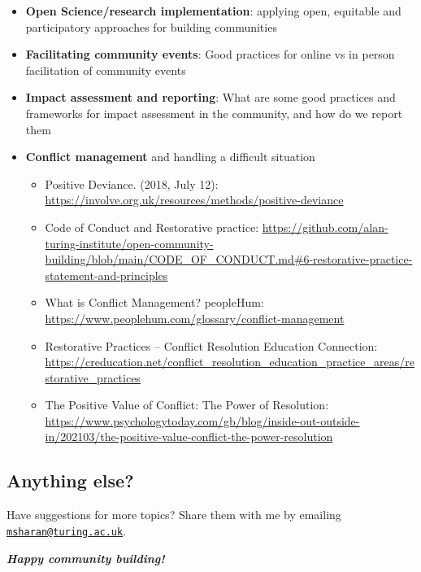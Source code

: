 \documentclass[
  letterpaper,
  DIV=11,
  numbers=noendperiod]{scrreport}
\providecommand{\tightlist}{%
  \setlength{\itemsep}{0pt}\setlength{\parskip}{0pt}}\usepackage{longtable,booktabs,array}
\begin{document}
\begin{itemize}
\tightlist
\item
  \textbf{Open Science/research implementation}: applying open,
  equitable and participatory approaches for building communities
\item
  \textbf{Facilitating community events}: Good practices for online vs
  in person facilitation of community events
\item
  \textbf{Impact assessment and reporting}: What are some good practices
  and frameworks for impact assessment in the community, and how do we
  report them
\item
  \textbf{Conflict management} and handling a difficult situation

  \begin{itemize}
  \tightlist
  \item
    Positive Deviance. (2018, July 12):
    \url{https://involve.org.uk/resources/methods/positive-deviance}
  \item
    Code of Conduct and Restorative practice:
    \url{https://github.com/alan-turing-institute/open-community-building/blob/main/CODE_OF_CONDUCT.md\#6-restorative-practice-statement-and-principles}
  \item
    What is Conflict Management? \textbar{} peopleHum:
    \url{https://www.peoplehum.com/glossary/conflict-management}
  \item
    Restorative Practices -- Conflict Resolution Education Connection:
    \url{https://creducation.net/conflict_resolution_education_practice_areas/restorative_practices}
  \item
    The Positive Value of Conflict: The Power of Resolution:
    \url{https://www.psychologytoday.com/gb/blog/inside-out-outside-in/202103/the-positive-value-conflict-the-power-resolution}
  \end{itemize}
\end{itemize}

\hypertarget{anything-else}{%
\subsection{Anything else?}\label{anything-else}}

Have suggestions for more topics? Share them with me by emailing
\href{mailto:msharan@turing.ac.uk}{\nolinkurl{msharan@turing.ac.uk}}.

\textbf{\emph{Happy community building!}}
\end{document}
